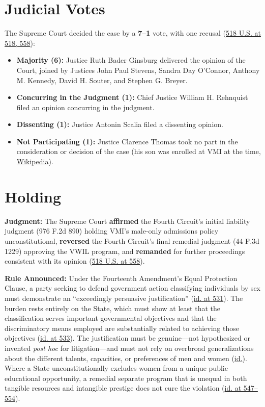 \documentclass[12pt]{article}
\begin{document}
\section{Judicial Votes}
The Supreme Court decided the case by a \textbf{7--1} vote, with one recusal (\href{https://supreme.justia.com/cases/federal/us/518/515/}{518 U.S. at 518, 558}):
\begin{itemize}
\item \textbf{Majority (6):} Justice Ruth Bader Ginsburg delivered the opinion of the Court, joined by Justices John Paul Stevens, Sandra Day O'Connor, Anthony M. Kennedy, David H. Souter, and Stephen G. Breyer.
\item \textbf{Concurring in the Judgment (1):} Chief Justice William H. Rehnquist filed an opinion concurring in the judgment.
\item \textbf{Dissenting (1):} Justice Antonin Scalia filed a dissenting opinion.
\item \textbf{Not Participating (1):} Justice Clarence Thomas took no part in the consideration or decision of the case (his son was enrolled at VMI at the time, \href{https://en.wikipedia.org/wiki/United_States_v._Virginia}{Wikipedia}).
\end{itemize}

\section{Holding}
\textbf{Judgment:} The Supreme Court \textbf{affirmed} the Fourth Circuit's initial liability judgment (976 F.2d 890) holding VMI's male-only admissions policy unconstitutional, \textbf{reversed} the Fourth Circuit's final remedial judgment (44 F.3d 1229) approving the VWIL program, and \textbf{remanded} for further proceedings consistent with its opinion (\href{https://supreme.justia.com/cases/federal/us/518/515/}{518 U.S. at 558}).

\textbf{Rule Announced:} Under the Fourteenth Amendment's Equal Protection Clause, a party seeking to defend government action classifying individuals by sex must demonstrate an ``exceedingly persuasive justification'' (\href{https://supreme.justia.com/cases/federal/us/518/515/}{id. at 531}). The burden rests entirely on the State, which must show at least that the classification serves important governmental objectives and that the discriminatory means employed are substantially related to achieving those objectives (\href{https://supreme.justia.com/cases/federal/us/518/515/}{id. at 533}). The justification must be genuine---not hypothesized or invented \textit{post hoc} for litigation---and must not rely on overbroad generalizations about the different talents, capacities, or preferences of men and women (\href{https://supreme.justia.com/cases/federal/us/518/515/}{id.}). Where a State unconstitutionally excludes women from a unique public educational opportunity, a remedial separate program that is unequal in both tangible resources and intangible prestige does not cure the violation (\href{https://supreme.justia.com/cases/federal/us/518/515/}{id. at 547--554}).
\end{document}
